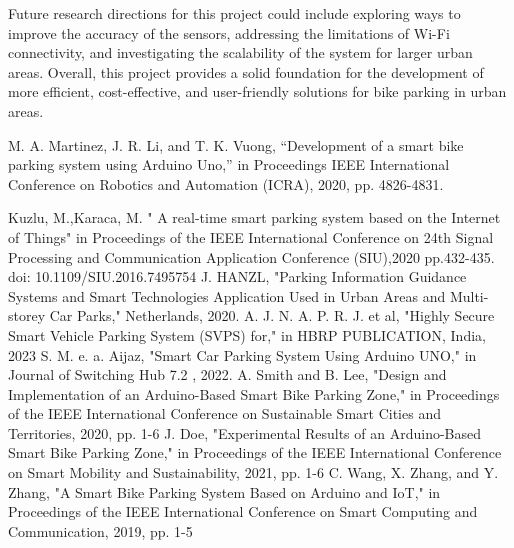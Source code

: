 \documentclass[conference]{IEEEtran}
\begin{document}
	Future research directions for this project could include exploring ways to improve the accuracy of the sensors, addressing the limitations of Wi-Fi connectivity, and investigating the scalability of the system for larger urban areas. Overall, this project provides a solid foundation for the development of more efficient, cost-effective, and user-friendly solutions for bike parking in urban areas.
	
\begin{thebibliography}{00}
	
 M. A. Martinez, J. R. Li, and T. K. Vuong, “Development of a smart bike parking system using Arduino Uno,” in Proceedings IEEE International Conference on Robotics and Automation (ICRA), 2020, pp. 4826-4831.
	
  Kuzlu, M.,Karaca, M. " A real-time smart parking system based on the Internet of Things"  in Proceedings of the IEEE International Conference on 24th Signal Processing and Communication Application Conference (SIU),2020 pp.432-435. doi: 10.1109/SIU.2016.7495754
 J. HANZL, "Parking Information Guidance Systems and Smart Technologies Application Used in Urban Areas and Multi-storey Car Parks," Netherlands, 2020. 
 A. J. N. A. P. R. J. et al, "Highly Secure Smart Vehicle Parking System (SVPS) for," in HBRP PUBLICATION, India, 2023 
 S. M. e. a. Aijaz, "Smart Car Parking System Using Arduino UNO," in Journal of Switching Hub 7.2 , 2022. 
A. Smith and B. Lee, "Design and Implementation of an Arduino-Based Smart Bike Parking Zone," in Proceedings of the IEEE International Conference on Sustainable Smart Cities and Territories, 2020, pp. 1-6
 J. Doe, "Experimental Results of an Arduino-Based Smart Bike Parking Zone," in Proceedings of the IEEE International Conference on Smart Mobility and Sustainability, 2021, pp. 1-6
 C. Wang, X. Zhang, and Y. Zhang, "A Smart Bike Parking System Based on Arduino and IoT," in Proceedings of the IEEE International Conference on Smart Computing and Communication, 2019, pp. 1-5

\end{thebibliography}
\end{document}
